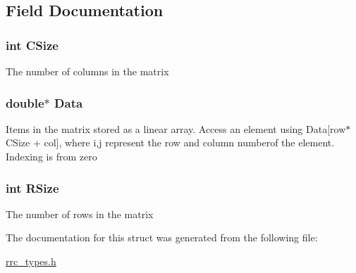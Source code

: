 \subsection{Field Documentation}
\hypertarget{struct_r_r_double_matrix_a17c9a5894aa9cb3789346dcaa9c370bb}{
\subsubsection[{C\+Size}]{\setlength{\rightskip}{0pt plus 5cm}int C\+Size}}\label{struct_r_r_double_matrix_a17c9a5894aa9cb3789346dcaa9c370bb}
The number of columns in the matrix \hypertarget{struct_r_r_double_matrix_a7c5cbda3aa940f4b0d6e8a1679307dfc}{
\subsubsection[{Data}]{\setlength{\rightskip}{0pt plus 5cm}double$\ast$ Data}}\label{struct_r_r_double_matrix_a7c5cbda3aa940f4b0d6e8a1679307dfc}
Items in the matrix stored as a linear array. Access an element using Data\mbox{[}row$\ast$\+C\+Size + col\mbox{]}, where i,j represent the row and column numberof the element. Indexing is from zero \hypertarget{struct_r_r_double_matrix_a4d8512c879223c0e0d1522dae38e7819}{
\subsubsection[{R\+Size}]{\setlength{\rightskip}{0pt plus 5cm}int R\+Size}}\label{struct_r_r_double_matrix_a4d8512c879223c0e0d1522dae38e7819}
The number of rows in the matrix 

The documentation for this struct was generated from the following file\+:\begin{DoxyCompactItemize}
\item 
\hyperlink{rrc__types_8h}{rrc\+\_\+types.\+h}\end{DoxyCompactItemize}
